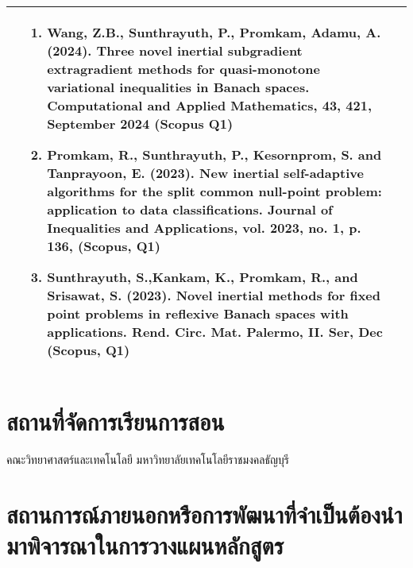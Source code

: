 {\begin{center}
\begin{longtable}{|p{}|p{}|p{}|}
& 
\begin{enumerate}[series=dear]
	\item Wang, Z.B., Sunthrayuth, P., Promkam, Adamu, A. (2024). Three novel inertial subgradient extragradient methods for quasi-monotone variational inequalities in Banach spaces. Computational and Applied Mathematics, 43, 421, September 2024 (Scopus Q1) 
	\item Promkam, R., Sunthrayuth, P., Kesornprom, S. and Tanprayoon, E. (2023). New inertial self-adaptive algorithms for the split common null-point problem: application to data classifications. Journal of Inequalities and Applications, vol. 2023, no. 1, p. 136, (Scopus, Q1) 
	\item Sunthrayuth, S.,Kankam, K., Promkam, R., and Srisawat, S. (2023). Novel inertial methods for fixed point problems in reflexive Banach spaces with applications. Rend. Circ. Mat. Palermo, II. Ser, Dec (Scopus, Q1)
\end{enumerate}
 \\ \hline

\end{longtable}
\end{center}

\section{สถานที่จัดการเรียนการสอน}
	คณะวิทยาศาสตร์และเทคโนโลยี มหาวิทยาลัยเทคโนโลยีราชมงคลธัญบุรี
\section{สถานการณ์ภายนอกหรือการพัฒนาที่จำเป็นต้องนำมาพิจารณาในการวางแผนหลักสูตร} \label{event_plan}
}

